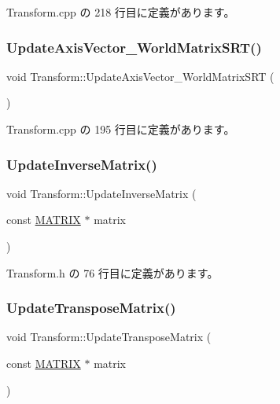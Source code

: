  Transform.\+cpp の 218 行目に定義があります。

\mbox{\label{class_transform_af02515be1947506212ca1c23223ce0b3}} 
\subsubsection{\texorpdfstring{Update\+Axis\+Vector\+\_\+\+World\+Matrix\+S\+R\+T()}{UpdateAxisVector\_WorldMatrixSRT()}}
{\footnotesize\ttfamily void Transform\+::\+Update\+Axis\+Vector\+\_\+\+World\+Matrix\+S\+RT (\begin{DoxyParamCaption}{ }\end{DoxyParamCaption})}



 Transform.\+cpp の 195 行目に定義があります。

\mbox{\label{class_transform_a3d2e5da24fb1c8015f5bb9a6c0a7a7de}} 
\subsubsection{\texorpdfstring{Update\+Inverse\+Matrix()}{UpdateInverseMatrix()}}
{\footnotesize\ttfamily void Transform\+::\+Update\+Inverse\+Matrix (\begin{DoxyParamCaption}\item[{const \mbox{\hyperlink{_vector3_d_8h_a032295cd9fb1b711757c90667278e744}{M\+A\+T\+R\+IX}} $\ast$}]{matrix }\end{DoxyParamCaption})\hspace{0.3cm}{\ttfamily [inline]}}



 Transform.\+h の 76 行目に定義があります。

\mbox{\label{class_transform_a486ae5501b5081b22ee053f787e0e4a2}} 
\subsubsection{\texorpdfstring{Update\+Transpose\+Matrix()}{UpdateTransposeMatrix()}}
{\footnotesize\ttfamily void Transform\+::\+Update\+Transpose\+Matrix (\begin{DoxyParamCaption}\item[{const \mbox{\hyperlink{_vector3_d_8h_a032295cd9fb1b711757c90667278e744}{M\+A\+T\+R\+IX}} $\ast$}]{matrix }\end{DoxyParamCaption})\hspace{0.3cm}{\ttfamily [inline]}}




